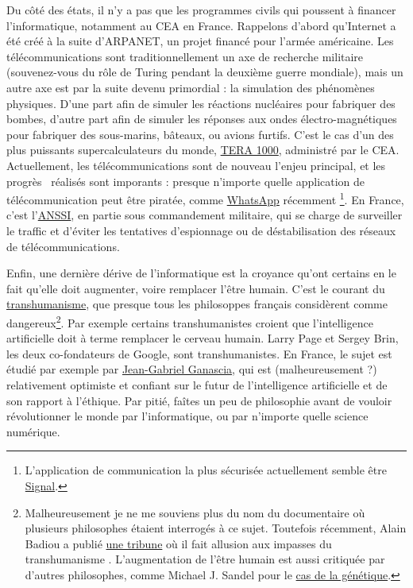 \documentclass[10pt]{article}
\begin{document}
Du côté des états, il n'y a pas que les programmes civils qui poussent à financer l'informatique, notamment au CEA en France.
Rappelons d'abord qu'Internet a été créé à la suite d'ARPANET, un projet financé pour l'armée américaine. Les télécommunications
sont traditionnellement un axe de recherche militaire (souvenez-vous du rôle de Turing pendant la deuxième guerre mondiale),
mais un autre axe est par la suite devenu primordial : la simulation des phénomènes physiques. D'une part afin de simuler les réactions
nucléaires pour fabriquer des bombes, d'autre part afin de simuler les réponses aux ondes électro-magnétiques pour fabriquer
des sous-marins, bâteaux, ou avions furtifs. C'est le cas d'un des plus puissants supercalculateurs du monde,
\href{https://fr.wikipedia.org/wiki/TERA-1000}{TERA 1000}, administré par le CEA. Actuellement, les télécommunications sont de nouveau
l'enjeu principal, et les \og progrès \fg~réalisés sont imporants : presque n'importe quelle application de télécommunication peut être
piratée, comme
\href{https://www.lemonde.fr/pixels/article/2019/05/14/une-faille-de-securite-de-whatsapp-utilisee-pour-installer-un-logiciel-espion-israelien_5461861_4408996.html}{WhatsApp}
récemment \footnote{L'application de communication la plus sécurisée actuellement semble être \href{https://signal.org/fr/}{Signal}.}.
En France, c'est l'\href{https://www.ssi.gouv.fr/}{ANSSI}, en partie sous commandement militaire, qui se charge de surveiller le traffic et d'éviter les tentatives d'espionnage
ou de déstabilisation des réseaux de télécommunications.


Enfin, une dernière dérive de l'informatique est la croyance qu'ont certains en
le fait qu'elle doit augmenter, voire remplacer l'être humain. C'est le courant du \href{https://fr.wikipedia.org/wiki/Transhumanisme}{transhumanisme},
que presque tous les philosoppes français considèrent comme dangereux\footnote{
  Malheureusement je ne me souviens plus du nom du documentaire où plusieurs philosophes étaient interrogés à ce sujet.
  Toutefois récemment, Alain Badiou a publié
  \href{https://www.lemonde.fr/series-d-ete-2018-long-format/article/2018/07/26/le-capitalisme-seul-responsable-de-l-exploitation-destructrice-de-la-nature_5336333_5325928.html?xtmc=badiou_capitalisme&xtcr=1}{une tribune}
  où il fait allusion aux \og impasses du transhumanisme \fg.
  L'augmentation de l'être humain est aussi critiquée par d'autres philosophes, comme Michael J. Sandel
  pour le \href{https://www.theatlantic.com/magazine/archive/2004/04/the-case-against-perfection/302927/}{cas de la génétique}.
}.
Par exemple certains transhumanistes croient que l'intelligence artificielle
doit à terme remplacer le cerveau humain.
Larry Page et Sergey Brin, les deux co-fondateurs de Google, sont transhumanistes.
En France, le sujet est étudié par exemple par \href{https://fr.wikipedia.org/wiki/Jean-Gabriel_Ganascia}{Jean-Gabriel Ganascia},
qui est (malheureusement ?) relativement optimiste et confiant sur le futur de l'intelligence artificielle et de son rapport à l'éthique.
Par pitié, faîtes un peu de philosophie avant de vouloir révolutionner le monde par l'informatique, ou par n'importe quelle science numérique.
\end{document}
